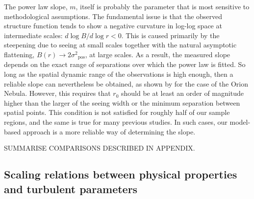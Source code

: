 \documentclass[fleqn,usenatbib, useAMS, a4paper]{mnras}
\newcommand\pos{\ensuremath{_{\mathrm{pos}}}}
\begin{document}
The power law slope, \(m\), itself is probably the parameter that
is most sensitive to methodological assumptions.
The fundamental issue is that the observed structure function tends to
show a negative curvature in log-log space at intermediate scales:
\(d\log B/ d\log r < 0\).
This is caused primarily by the steepening due to seeing at small scales
together with the natural asymptotic flattening, 
\(B(r) \to 2 \sigma^2\pos\), at large scales.
As a result, the measured slope depends on the exact range of
separations over which the power law is fitted.
So long as the spatial dynamic range of the observations is high enough,
then a reliable slope can nevertheless be obtained,
as shown by \citet{arthur2016turbulence} for the case of the Orion Nebula.
However, this requires that \(r_0\) should be at least an order of
magnitude higher than the larger of the seeing width
or the minimum separation between spatial points.
This condition is not satisfied for roughly half of our sample regions,
and the same is true for many previous studies.
In such cases, our model-based approach is a more reliable way of
determining the slope. 


SUMMARISE COMPARISONS DESCRIBED IN APPENDIX. 


\subsection{Scaling relations between physical properties and turbulent parameters}\label{sec:scaling-relations}
\end{document}

